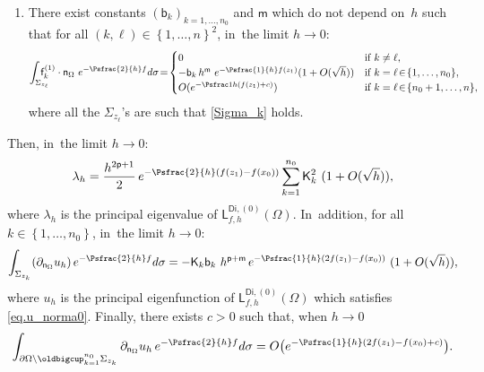 \begin{proposition}
\begin{enumerate}
\begin{enumerate}
\begin{equation*}
\big \lp \nabla\mathsf u^{(0)}, \mathsf f_k^{(1)}\big\rp_{L^2_w(\Omega)} = \mathsf K_k\ h^{\mathsf p} e^{-\Psfrac{1}{h}(f(z_1)- f(x_0))} \ (1 + O(\sqrt h)),
\end{equation*}
where we recall $f(z_k)=f(z_1)$ for $k=1,\dots,n_0$. If~$k>n_0$, it~holds for $h$ small enough:
\begin{equation*}
\big \vert \big \lp \nabla\mathsf u^{(0)}, \mathsf f_k^{(1)}\big\rp_{L^2_w(\Omega)} \big \vert \le e^{-\Psfrac{1}{h}(f(z_1)- f(x_0) +\ve)}.
\end{equation*}
\item\label{ESTIME4b}
There exist constants $(\mathsf b_k)_{k=1,\dots,n_0}$ and $\mathsf m$ which do not depend on~$h$ such that for all $ (k,\ell)
\in \left\{1,\ldots,n\right\}^2$, in~the limit $h\to 0$:
\begin{equation*}
\int_{\Sigma_{z_\ell}} \!\!\! \!\!\! \mathsf
f_k^{(1)} \cdot \mathsf n_\Omega \ e^{-\Psfrac{2}{h} f} d\sigma
\!=\! \begin{cases} 0 & \text{if } k\neq \ell,\\
- \mathsf b_k \, h^{\mathsf m } \ e^{-\Psfrac{1}{h} f(z_1)} (1 + O(\sqrt h)) & \text{if } k=\ell \!\in\! \{1,\dots,n_0\}, \\
O(e^{-\Psfrac 1h (f(z_1) +c)}) & \text{if } k=\ell \!\in\! \{n_0+1,\ldots,n\},
\end{cases}
\end{equation*}
where all the $\Sigma_{z_\ell}$'s are such that \eqref{Sigma_k} holds.
\end{enumerate}
\end{enumerate}
Then, in~the limit $h\to 0$:
\[
\lambda_h=\frac{h^{2\mathsf p+1}}{2} \, e^{-\Psfrac{2}{h}(f(z_1)- f(x_0))} \sum_{k=1}^{n_0} \mathsf K_k^2 \ (1 + O(\sqrt h)),
\]
where $\lambda_h$ is the principal eigenvalue of $\mathsf L^{\mathsf{Di},(0)}_{f,h}(\Omega)$. In~addition, for all $k\in \left\{1,\ldots,n_0\right\}$, in~the limit $h\to 0$:
\begin{equation*}
\int_{\Sigma_{z_k}} (\partial_{\mathsf n_\Omega} u_h)\, e^{-\Psfrac{2}{h}f} d\sigma = -\mathsf K_k \mathsf b_k \ h^{\mathsf p+\mathsf m} \, e^{-\Psfrac{1}{h}(2f(z_1)- f(x_0))} \ (1+ O(\sqrt h)),
\end{equation*}
where $u_h$ is the principal eigenfunction of $\mathsf L^{\mathsf{Di},(0)}_{f,h}(\Omega)$ which satisfies \eqref{eq.u_norma0}. Finally, there exists $c>0$ such that, when $h\to 0$
\[
\int_{\partial \Omega \setminus \oldbigcup_{k=1}^{n_0}\Sigma_{z_k}} \partial_{\mathsf n_\Omega} u_h \, e^{-\Psfrac{2}{h} f} d\sigma= O\bigl(e^{-\Psfrac{1}{h}(2f(z_1)-f(x_0)+c)} \bigr).
\]
\end{proposition}

